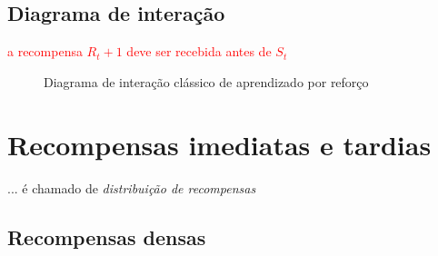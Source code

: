 \documentclass{article}
\begin{document}
        \subsection{Diagrama de interação}
        
            \textcolor{red}{a recompensa $R_t+1$ deve ser recebida antes de $S_t$}
        
            \begin{figure}[ht]
                \centering
                \rlinteraction
                \caption{Diagrama de interação clássico de aprendizado por reforço}
                \label{diag:classical-rl}
            \end{figure}
            
                \section{Recompensas imediatas e tardias}
    
        ... é chamado de \emph{distribuição de recompensas}
    
        \subsection{Recompensas densas}
        
\end{document}
